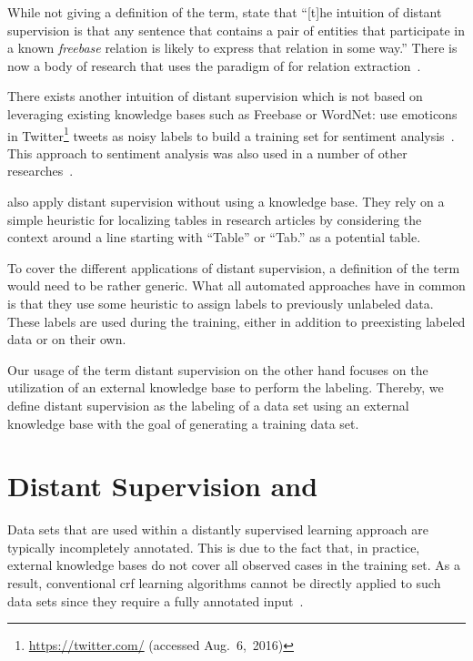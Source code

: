 While not giving a definition of the term, \citet[p.~2]{mintz2009distant} state that ``[t]he intuition of distant supervision is that any sentence that contains a pair of entities that participate in a known \textit{freebase} relation is likely to express that relation in some way.''
There is now a body of research that uses the paradigm of \citet{mintz2009distant} for relation extraction~\citep{benson2011event,ritter2011named,nguyen2011end,takamatsu2012reducing,xu2013filling}.

\bigskip

There exists another intuition of \gls{distant supervision} which is not based on leveraging existing knowledge bases such as Freebase or WordNet:
\citet{go2009twitter} use emoticons in Twitter\footnote{\url{https://twitter.com/} (accessed Aug.~6,~2016)} tweets as noisy labels to build a training set for sentiment analysis~\citep{go2009twitter}.
This approach to sentiment analysis was also used in a number of other researches~\citep{purver2012experimenting,marchetti2012learning,suttles2013distant}.

\citet{fan2015detecting} also apply distant supervision without using a knowledge base.
They rely on a simple heuristic for localizing tables in research articles by considering the context around a line starting with ``Table'' or ``Tab.'' as a potential table.

\bigskip

To cover the different applications of \gls{distant supervision}, a definition of the term would need to be rather generic.
What all automated approaches have in common is that they use some heuristic to assign labels to previously unlabeled data. These labels are used during the training, either in addition to preexisting labeled data or on their own.

Our usage of the term \gls{distant supervision} on the other hand focuses on the utilization of an external knowledge base to perform the labeling.
Thereby, we define \gls{distant supervision} as the labeling of a data set using an external knowledge base with the goal of generating a training data set.

\section{Distant Supervision and }\label{sec:distant-supervision-and-crfs}

Data sets that are used within a distantly supervised learning approach are typically incompletely annotated.
This is due to the fact that, in practice, external knowledge bases do not cover all observed cases in the training set.
As a result, conventional \gls{crf} learning algorithms cannot be directly applied to such data sets since they require a fully annotated input~\citep{tsuboi2008training}.

